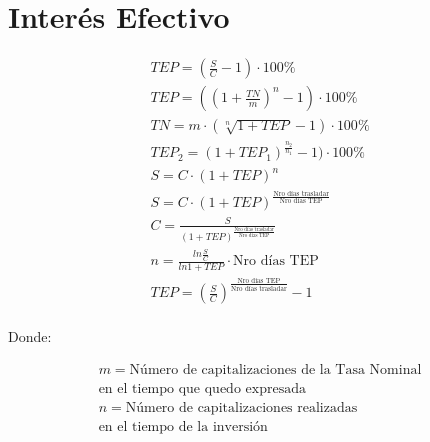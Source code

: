\documentclass[a4paper, twocolumn]{article}
\begin{document}
\section{Interés Efectivo}

\begin{gather*}
    TEP = (\frac{S}{C} - 1) \cdot 100 \% \\
    TEP = ((1 + \frac{TN}{m})^n - 1) \cdot 100 \% \\
    TN = m \cdot (\sqrt[n]{1 + TEP} - 1) \cdot 100 \% \\
    TEP_2 = (1 + TEP_1)^{\frac{n_2}{n_1}} - 1) \cdot 100 \% \\
    S = C \cdot (1 + TEP)^n \\
    S = C \cdot (1 + TEP)^{\frac{\text{Nro días trasladar}}{\text{Nro días TEP}}} \\
    C = \frac{S}{(1 + TEP)^{\frac{\text{Nro días trasladar}}{\text{Nro días TEP}}}} \\
    n = \frac{ln{\frac{S}{C}}}{ln{1 + TEP}} \cdot {\text{Nro días TEP}} \\
    TEP = (\frac{S}{C})^{\frac{\text{Nro días TEP}}{\text{Nro días trasladar}}} - 1 \\
\end{gather*}

Donde:

\begin{gather*}
    m = \text{Número de capitalizaciones de la Tasa Nominal} \\
    \text{en el tiempo que quedo expresada} \\
    n = \text{Número de capitalizaciones realizadas} \\
    \text{en el tiempo de la inversión} \\
\end{gather*}
\end{document}
